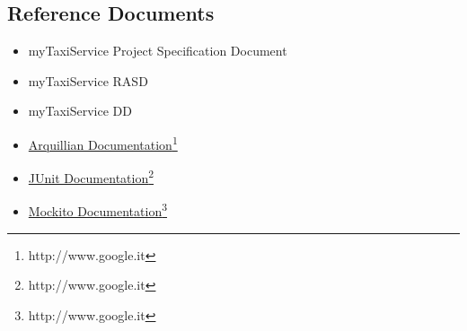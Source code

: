 \subsection{Reference Documents}
\begin{itemize}
	\item myTaxiService Project Specification Document
	\item myTaxiService RASD
	\item myTaxiService DD
	\item \href{http://www.google.it}{Arquillian Documentation}\footnote{http://www.google.it}
	\item \href{http://www.google.it}{JUnit Documentation}\footnote{http://www.google.it}
	\item \href{http://www.google.it}{Mockito Documentation}\footnote{http://www.google.it}
\end{itemize}